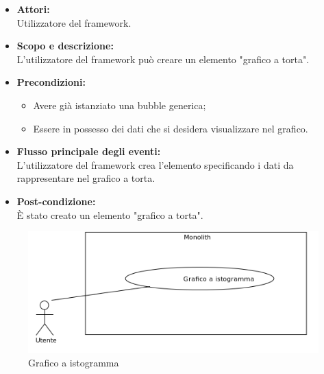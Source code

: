 \begin{itemize}
	\item \textbf{Attori:}
	\\Utilizzatore del framework.
	\item \textbf{Scopo e descrizione:} 
	\\L'utilizzatore del framework può creare un elemento "grafico a torta".
	\item \textbf{Precondizioni:}
	\begin{itemize}
		\item Avere già istanziato una bubble generica;
		\item Essere in possesso dei dati che si desidera visualizzare nel grafico.
	\end{itemize}
	\item \textbf{Flusso principale degli eventi:}
	\\L'utilizzatore del framework crea l'elemento specificando i dati da rappresentare nel grafico a torta.
	\item \textbf{Post-condizione:}
	\\È stato creato un elemento "grafico a torta".
\end{itemize}


\begin{figure}[H]
	\centering
	\includegraphics[width=15cm]{../../documenti/AnalisiDeiRequisiti/Diagrammi_img/uc1_29.png}
	\caption{\UCFFCaption{} Grafico a istogramma}
\end{figure}

